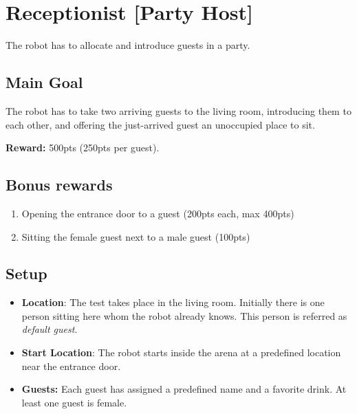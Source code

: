 \section{Receptionist [Party Host]}

The robot has to allocate and introduce guests in a party.


\subsection{Main Goal}
The robot has to take two arriving guests to the living room, introducing them to each other, and offering the just-arrived guest an unoccupied place to sit.

\noindent\textbf{Reward:} 500pts (250pts per guest).

\subsection{Bonus rewards}
\begin{enumerate}[nosep]
	\item Opening the entrance door to a guest (200pts each, max 400pts)
	\item Sitting the female guest next to a male guest (100pts)
\end{enumerate}


\subsection{Setup}
\begin{itemize}
	\item \textbf{Location}: The test takes place in the living room.
	Initially there is one person sitting here whom the robot already knows.
	This person is referred as \emph{default guest}.

	\item \textbf{Start Location}: The robot starts inside the arena at a predefined location near the entrance door.

	\item \textbf{Guests:} Each guest has assigned a predefined name and a favorite drink.
	At least one guest is female.
\end{itemize}

